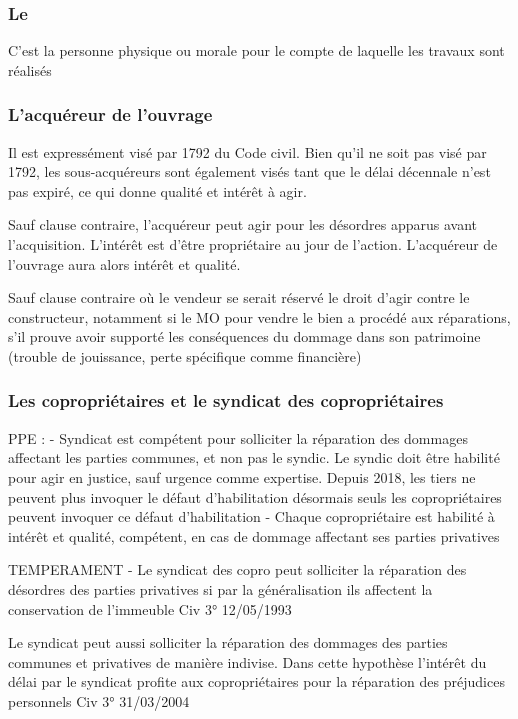 		\subsubsection{Le \Mo}

			C’est la personne physique ou morale pour le compte de laquelle les travaux sont réalisés

		\subsubsection{L'acquéreur de l'ouvrage}

		Il est expressément visé par 1792 du Code civil. Bien qu’il ne soit pas visé par 1792, les sous-acquéreurs sont également visés tant que le délai décennale n’est pas expiré, ce qui donne qualité et intérêt à agir.

		Sauf clause contraire, l’acquéreur peut agir pour les désordres apparus avant l’acquisition. L’intérêt est d’être propriétaire au jour de l’action. L’acquéreur de l’ouvrage aura alors intérêt et qualité.

		Sauf clause contraire où le vendeur se serait réservé le droit d’agir contre le constructeur, notamment si le MO pour vendre le bien a procédé aux réparations, s’il prouve avoir supporté les conséquences du dommage dans son patrimoine (trouble de jouissance, perte spécifique comme financière)


		\subsubsection{Les copropriétaires et le syndicat des copropriétaires}

		PPE :
		-	Syndicat est compétent pour solliciter la réparation des dommages affectant les parties communes, et non pas le syndic. Le syndic doit être habilité pour agir en justice, sauf urgence comme expertise. Depuis 2018, les tiers ne peuvent plus invoquer le défaut d’habilitation désormais seuls les copropriétaires peuvent invoquer ce défaut d’habilitation
		-	Chaque copropriétaire est habilité à intérêt et qualité, compétent, en cas de dommage affectant ses parties privatives

		TEMPERAMENT
		-	Le syndicat des copro peut solliciter la réparation des désordres des parties privatives si par la généralisation ils affectent la conservation de l’immeuble Civ 3° 12/05/1993

		Le syndicat peut aussi solliciter la réparation des dommages des parties communes et privatives de manière indivise. Dans cette hypothèse l’intérêt du délai par le syndicat profite aux copropriétaires pour la réparation des préjudices personnels Civ 3° 31/03/2004

